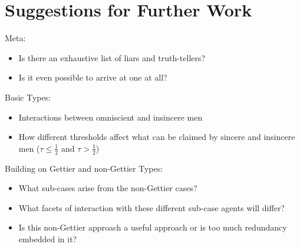 \documentclass[12pt, titlepage, twoside, a4paper]{report}
\begin{document}
\section{Suggestions for Further Work}
Meta:
\begin{itemize}
\item Is there an exhaustive list of liars and truth-tellers?
\item Is it even possible to arrive at one at all?
\end{itemize}
Basic Types:
\begin{itemize}
\item Interactions between omniscient and insincere men
\item How different thresholds affect what can be claimed by sincere and insincere men ($\tau \leq \frac{1}{2}$ and $\tau > \frac{1}{2}$)
\end{itemize}
Building on Gettier and non-Gettier Types:
\begin{itemize}
\item What sub-cases arise from the non-Gettier cases?\item What facets of interaction with these different sub-case agents will differ?
\item Is this non-Gettier approach a useful approach or is too much redundancy embedded in it?
\end{itemize}

\printbibliography
\end{document}
